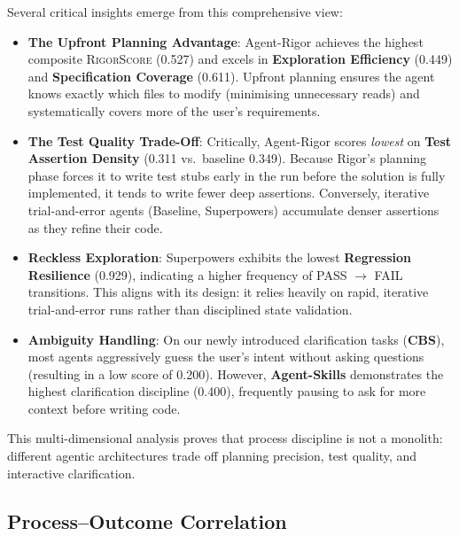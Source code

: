 \documentclass[letterpaper, 10 pt, conference]{ieeeconf}
\newcommand{\rigorscore}{\textsc{RigorScore}}
\begin{document}
Several critical insights emerge from this comprehensive view:
\begin{itemize}[leftmargin=*]
  \item \textbf{The Upfront Planning Advantage}: Agent-Rigor achieves the highest composite \rigorscore{} (0.527) and excels in \textbf{Exploration Efficiency} (0.449) and \textbf{Specification Coverage} (0.611). Upfront planning ensures the agent knows exactly which files to modify (minimising unnecessary reads) and systematically covers more of the user's requirements.
  \item \textbf{The Test Quality Trade-Off}: Critically, Agent-Rigor scores \emph{lowest} on \textbf{Test Assertion Density} (0.311 vs.\ baseline 0.349). Because Rigor's planning phase forces it to write test stubs early in the run before the solution is fully implemented, it tends to write fewer deep assertions. Conversely, iterative trial-and-error agents (Baseline, Superpowers) accumulate denser assertions as they refine their code.
  \item \textbf{Reckless Exploration}: Superpowers exhibits the lowest \textbf{Regression Resilience} (0.929), indicating a higher frequency of PASS $\rightarrow$ FAIL transitions. This aligns with its design: it relies heavily on rapid, iterative trial-and-error runs rather than disciplined state validation.
  \item \textbf{Ambiguity Handling}: On our newly introduced clarification tasks (\textbf{CBS}), most agents aggressively guess the user's intent without asking questions (resulting in a low score of 0.200). However, \textbf{Agent-Skills} demonstrates the highest clarification discipline (0.400), frequently pausing to ask for more context before writing code.
\end{itemize}
This multi-dimensional analysis proves that process discipline is not a monolith: different agentic architectures trade off planning precision, test quality, and interactive clarification.

\subsection{Process--Outcome Correlation}
\end{document}
